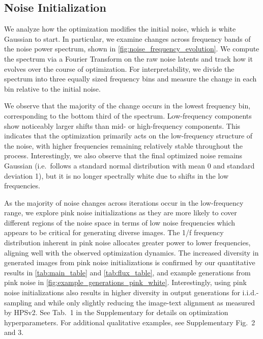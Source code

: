 \documentclass[10pt,twocolumn,letterpaper]{article}
\newcommand{\myparagraph}[1]{\vspace{1pt}\noindent{\bf{#1}}}
\begin{document}
\subsection{Noise Initialization}
\label{subsec:noise}
\myparagraph{Noise Evolution.} We analyze how the optimization modifies the initial noise, which is white Gaussian to start. In particular, we examine changes across frequency bands of the noise power spectrum, shown in \cref{fig:noise_frequency_evolution}. We compute the spectrum via a Fourier Transform on the raw noise latents and track how it evolves over the course of optimization. For interpretability, we divide the spectrum into three equally sized frequency bins and measure the change in each bin relative to the initial noise. 

We observe that the majority of the change occurs in the lowest frequency bin, corresponding to the bottom third of the spectrum. Low-frequency components show noticeably larger shifts than mid- or high-frequency components. This indicates that the optimization primarily acts on the low-frequency structure of the noise, with higher frequencies remaining relatively stable throughout the process. Interestingly, we also observe that the final optimized noise remains Gaussian (i.e.\ follows a standard normal distribution with mean 0 and standard deviation 1), but it is no longer spectrally white due to shifts in the low frequencies.


\myparagraph{Pink Noise Initialization.} As the majority of noise changes across iterations occur in the low-frequency range, we explore pink noise initializations as they are more likely to cover different regions of the noise space in terms of low noise frequencies which appears to be critical for generating diverse images. 
The 1/f frequency distribution inherent in pink noise allocates greater power to lower frequencies, aligning well with the observed optimization dynamics. 
The increased diversity in generated images from pink noise initializations is confirmed by our quantitative results in \cref{tab:main_table} and \cref{tab:flux_table}, and example generations from pink noise in \cref{fig:example_generations_pink_white}. Interestingly, using pink noise initializations also results in higher diversity in output generations for  $\text{i.i.d.}$-sampling and \cite{gi} while only slightly reducing the image-text alignment as measured by HPSv2. See Tab.~1  in the Supplementary for details on optimization hyperparameters. For additional qualitative examples, see Supplementary  Fig.~2 and 3.
\end{document}
